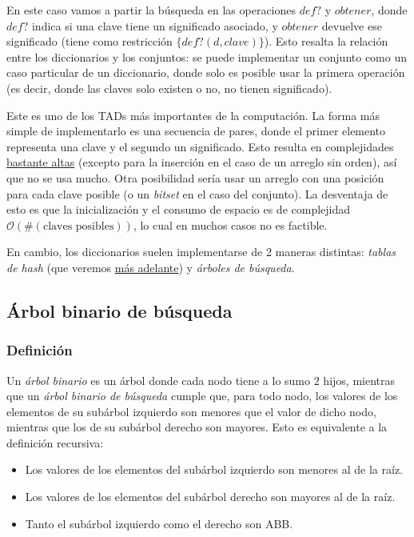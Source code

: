 \documentclass{article}
\newcommand{\BigO}[1]{{\mathcal{O}(#1)}}
\begin{document}
En este caso vamos a partir la búsqueda en las operaciones $def?$ y $obtener$, donde $def?$ indica si una clave tiene un significado asociado, y $obtener$ devuelve ese significado (tiene como restricción $\{def?(d, clave)\}$). Esto resalta la relación entre los diccionarios y los conjuntos: se puede implementar un conjunto como un caso particular de un diccionario, donde solo es posible usar la primera operación (es decir, donde las claves solo existen o no, no tienen significado).

Este es uno de los TADs más importantes de la computación. La forma más simple de implementarlo es una secuencia de pares, donde el primer elemento representa una clave y el segundo un significado. Esto resulta en complejidades \hyperref[table-dict-complexities]{bastante altas} (excepto para la inserción en el caso de un arreglo sin orden), así que no se usa mucho. Otra posibilidad sería usar un arreglo con una posición para cada clave posible (o un \textit{bitset} en el caso del conjunto). La desventaja de esto es que la inicialización y el consumo de espacio es de complejidad $\BigO{\#(\text{claves posibles})}$, lo cual en muchos casos no es factible.


En cambio, los diccionarios suelen implementarse de 2 maneras distintas: \textit{tablas de hash} (que veremos \hyperref[sec-hash-tables]{más adelante}) y \textit{árboles de búsqueda}.

\subsection{Árbol binario de búsqueda}

\subsubsection{Definición}

Un \textit{árbol binario} es un árbol donde cada nodo tiene a lo sumo $2$ hijos, mientras que un \textit{árbol binario de búsqueda} cumple que, para todo nodo, los valores de los elementos de su subárbol izquierdo son menores que el valor de dicho nodo, mientras que los de su subárbol derecho son mayores. Esto es equivalente a la definición recursiva:
\begin{itemize}
    \item Los valores de los elementos del subárbol izquierdo son menores al de la raíz.
    \item Los valores de los elementos del subárbol derecho son mayores al de la raíz.
    \item Tanto el subárbol izquierdo como el derecho son ABB.
\end{itemize}
\end{document}
